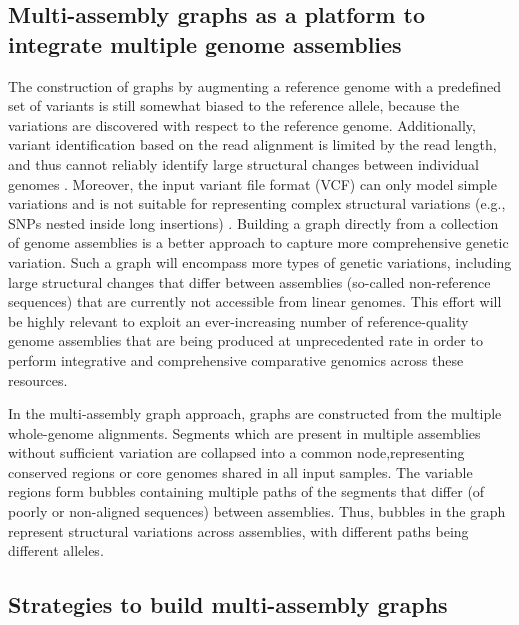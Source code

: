 \documentclass[../main.tex]{subfiles}
\begin{document}
\subsection*{Multi-assembly graphs as a platform to integrate multiple genome assemblies}

The construction of graphs by augmenting a reference genome with a predefined set of variants  is still somewhat biased to the reference allele, because the variations are discovered with respect to the reference genome. Additionally, variant identification based on the read alignment is limited by the read length, and thus cannot reliably identify large structural changes between individual genomes \citep{feng2020higher}. Moreover, the input variant file format (VCF) can only model simple variations and is not suitable for representing complex structural variations (e.g., SNPs nested inside long insertions) \citep{letcher2021enabling}.  Building a graph directly from a collection of genome assemblies is a better approach to capture more comprehensive genetic variation. Such a graph will encompass more types of genetic variations, including large structural changes that differ between assemblies (so-called non-reference sequences) that are currently not accessible from linear genomes. This effort will be highly relevant to exploit an ever-increasing number of reference-quality genome assemblies that are being produced at unprecedented rate in order to perform integrative and comprehensive comparative genomics across these resources. 

In the multi-assembly graph approach, graphs are constructed from the multiple whole-genome alignments. Segments which are present in multiple assemblies without sufficient variation are collapsed into a common node,representing conserved regions or core genomes shared in all input samples. The variable regions form bubbles containing multiple paths of the segments that differ (of poorly or non-aligned sequences) between assemblies. Thus, bubbles in the graph represent structural variations across assemblies, with different paths being different alleles. 

\subsection*{Strategies to build multi-assembly graphs}
\end{document}
